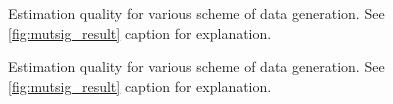 \begin{figure}[]\ContinuedFloat
  \centering
  \caption{Estimation quality for various scheme of data generation. See \cref{fig:mutsig_result} caption for explanation.}
  \label{fig:mutsig_result_appendix_3}
\end{figure}

\begin{figure}[]\ContinuedFloat
  \centering
  \caption{Estimation quality for various scheme of data generation. See \cref{fig:mutsig_result} caption for explanation.}
  \label{fig:mutsig_result_appendix_4}
\end{figure}

